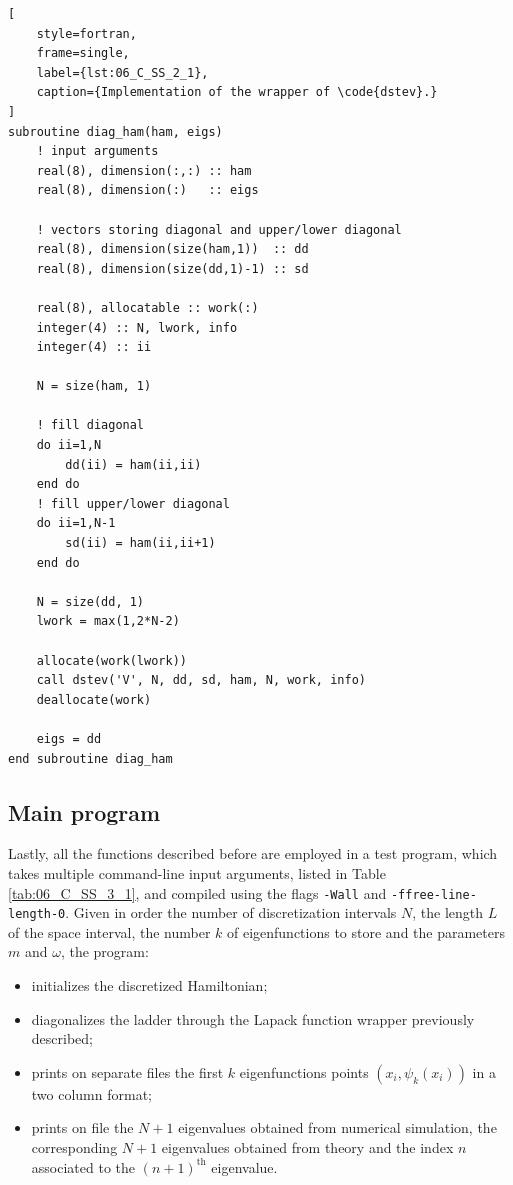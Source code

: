 \documentclass[pra, onecolumn, notitlepage, floats, 11pt]{revtex4-1}
\newcommand{\code}[2][black]{\color{#1}\texttt{#2}}
\begin{document}
\medskip
\begin{lstlisting}[
    style=fortran,
    frame=single,
    label={lst:06_C_SS_2_1},
    caption={Implementation of the wrapper of \code{dstev}.}
]
subroutine diag_ham(ham, eigs)
    ! input arguments
    real(8), dimension(:,:) :: ham
    real(8), dimension(:)   :: eigs

    ! vectors storing diagonal and upper/lower diagonal
    real(8), dimension(size(ham,1))  :: dd
    real(8), dimension(size(dd,1)-1) :: sd

    real(8), allocatable :: work(:)
    integer(4) :: N, lwork, info
    integer(4) :: ii

    N = size(ham, 1)

    ! fill diagonal
    do ii=1,N
        dd(ii) = ham(ii,ii)
    end do
    ! fill upper/lower diagonal
    do ii=1,N-1
        sd(ii) = ham(ii,ii+1)
    end do

    N = size(dd, 1)
    lwork = max(1,2*N-2)

    allocate(work(lwork))
    call dstev('V', N, dd, sd, ham, N, work, info)
    deallocate(work)

    eigs = dd
end subroutine diag_ham
\end{lstlisting}



\subsection{Main program}
Lastly, all the functions described before are employed in a test program, which takes multiple command-line input arguments, listed in Table \ref{tab:06_C_SS_3_1}, and compiled using the flags \code{-Wall} and \code{-ffree-line-length-0}. Given in order the number of discretization intervals \( N \), the length \( L \) of the space interval, the number \( k \) of eigenfunctions to store and the parameters \( m \) and \( \omega \), the program:
\begin{itemize}
    \item initializes the discretized Hamiltonian;
    \item diagonalizes the ladder through the Lapack function wrapper previously described;
    \item prints on separate files the first \( k \) eigenfunctions points \( (x_{i},\psi_{k}(x_{i})) \) in a two column format;
    \item prints on file the \( N+1 \) eigenvalues obtained from numerical simulation, the corresponding \( N+1 \) eigenvalues obtained from theory and the index \( n \) associated to the \( (n+1)^{\text{th}} \) eigenvalue.
\end{itemize}
\end{document}
